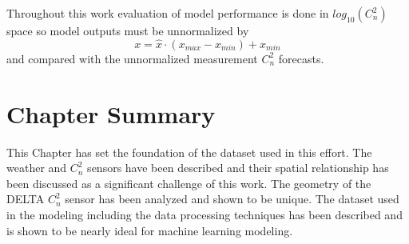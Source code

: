 Throughout this work evaluation of model performance is done in $log_{10}(C_{n}^{2})$ space so model outputs must be unnormalized by
\begin{equation} \label{eq:unnormalize_data}
	x = \hat{x} \cdot \left(x_{max} - x_{min}\right) + x_{min}
\end{equation}
and compared with the unnormalized measurement $C_{n}^{2}$ forecasts.

\section{Chapter Summary}
This Chapter has set the foundation of the dataset used in this effort. The weather and $C_{n}^{2}$ sensors have been described and their spatial relationship has been discussed as a significant challenge of this work. The geometry of the \ac{DELTA} $C_{n}^{2}$ sensor has been analyzed and shown to be unique. The dataset used in the modeling including the data processing techniques has been described and is shown to be nearly ideal for machine learning modeling.